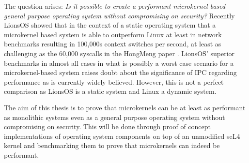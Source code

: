 \documentclass[../thesis.tex]{subfiles}
\begin{document}
The question arises: \textit{Is it possible to create a performant microkernel-based general purpose operating system without compromising on security?} Recently LionsOS showed that in the context of a static operating system that a microkernel based system is able to outperform Linux at least in network benchmarks resulting in 100,000s context switches per second, at least as challenging as the 60,000 syscalls in the HongMeng paper \citep{Heiser_VCJGNLDZAZWPDB_25,Chen_JWLLLWHLYWYPX_24}. LionsOS' superior benchmarks in almost all cases in what is possibly a worst case scenario for a microkernel-based system raises doubt about the significance of IPC regarding performance as is currently widely believed. However, this is not a perfect comparison as LionsOS is a static system and Linux a dynamic system.

The aim of this thesis is to prove that microkernels can be at least as performant as monolithic systems even as a general purpose operating system without compromising on security. This will be done through proof of concept implementations of operating system components on top of an unmodified seL4 kernel and benchmarking them to prove that microkernels can indeed be performant.
\end{document}
